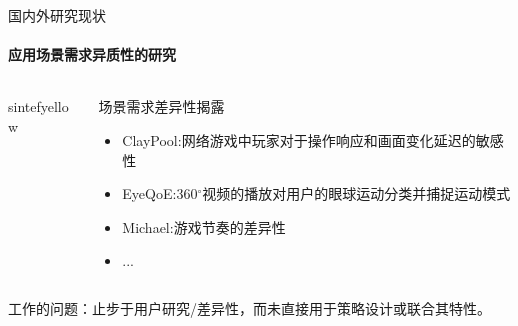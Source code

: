 \documentclass{beamer}
\begin{document}
\begin{frame}[fragile]{国内外研究现状}
\framesubtitle{应用场景需求异质性的研究}
    \begin{columns}
        \begin{column}{0.55\textwidth}
            \begin{colorblock}[black]{sintefyellow}{}
            
            \end{colorblock}

        \end{column}
    
        \begin{column}{0.45\textwidth}
        \begin{block}{场景需求差异性揭露}
            \begin{itemize}
                \item ClayPool:网络游戏中玩家对于操作响应和画面变化延迟的敏感性\cite{claypool2006latency,claypool2010latency}

                \item EyeQoE\cite{zhu2022eyeqoe}:360$^{\circ}$视频的播放对用户的眼球运动分类并捕捉运动模式
                \item Michael:游戏节奏的差异性\cite{jarschel2011evaluation}
                \item ...
            \end{itemize}
        
        \end{block}

        \end{column}
    \end{columns}
    \vspace{0.3em}
    \alert{工作的问题：止步于用户研究/差异性，而未直接用于策略设计或联合其特性。}

\end{frame}
\end{document}
